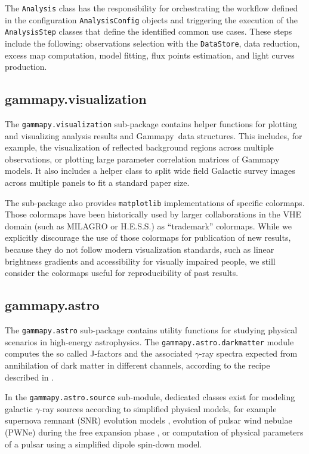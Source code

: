 \documentclass[longauth]{aa}
\newcommand{\code}[1]{\texttt{#1}}
\newcommand{\gammapy}{Gammapy\xspace}
\newcommand{\hess}{H.E.S.S.\xspace}
\newcommand{\gammaray}{$\gamma$-ray\xspace}
\newcommand{\milagro}{MILAGRO\xspace}
\begin{document}
The \code{Analysis} class has the responsibility for orchestrating the workflow
defined in the configuration \code{AnalysisConfig} objects and triggering the execution of
the \code{AnalysisStep} classes that define the identified common use cases. These
steps include the following: observations selection with the \code{DataStore},  data
reduction, excess map computation, model fitting, flux points estimation, and
light curves production.

\subsection{gammapy.visualization}
\label{ssec:gammapy-visualization}
The \code{gammapy.visualization} sub-package contains helper functions
for plotting and visualizing analysis results and \gammapy~data structures.
This includes, for example, the visualization of reflected background regions across
multiple observations, or plotting large parameter correlation matrices of
\gammapy models. It also includes a helper class to split
wide field Galactic survey images across multiple panels to fit a standard
paper size.

The sub-package also provides \texttt{matplotlib} implementations of specific
colormaps. Those colormaps have been historically used by larger collaborations
in the VHE domain (such as \milagro or \hess) as \enquote{trademark}
colormaps. While we explicitly discourage the use of those colormaps for publication
of new results, because they do not follow modern visualization
standards, such as linear brightness gradients and accessibility
for visually impaired people, we still consider the colormaps
useful for reproducibility of past results.

\subsection{gammapy.astro}
\label{ssec:gammapy-astro}
The \code{gammapy.astro} sub-package contains utility functions for studying physical
scenarios in high-energy astrophysics. The \code{gammapy.astro.darkmatter} module
computes the so called J-factors and the associated \gammaray spectra expected
from annihilation of dark matter in different channels, according to the recipe
described in \cite{2011JCAP...03..051C}.

In the \code{gammapy.astro.source} sub-module, dedicated classes exist for modeling
galactic \gammaray sources according to simplified physical models, for example supernova remnant (SNR) evolution
models \citep{1950RSPSA.201..159T, 1999ApJS..120..299T}, evolution of pulsar wind nebulae (PWNe) during the
free expansion phase \citep{2006ARA&A..44...17G}, or computation
of physical parameters of a pulsar using a simplified dipole spin-down model.
\end{document}
